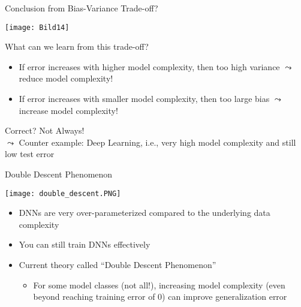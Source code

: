 \documentclass[aspectratio=169]{../latex_main/tntbeamer}  %
\begin{document}
	\begin{frame}{Conclusion from Bias-Variance Trade-off?}
	\vspace{-2em}
	   \begin{center}
	        \texttt{[image: Bild14]}   
	   \end{center}
	    
	 What can we learn from this trade-off?
	 
	 \begin{itemize}
	     \item If error increases with higher model complexity, then too high variance $\leadsto$ reduce model complexity!
	     \item If error increases with smaller model complexity, then too large bias $\leadsto$ increase model complexity!
	 \end{itemize}
	 
	 Correct? Not Always!\\
	 $\leadsto$ Counter example: Deep Learning, i.e., very high model complexity and still low test error
	    
	\end{frame}
	
	\begin{frame}{Double Descent Phenomenon}
	\vspace{-2em}
	   \begin{center}
	        \texttt{[image: double\_descent.PNG]}   
	   \end{center}
    
    \begin{itemize}
        \item DNNs are very over-parameterized compared to the underlying data complexity
        \item You can still train DNNs effectively
        \item Current theory called ``Double Descent Phenomenon''
        \begin{itemize}
            \item For some model classes (not all!), increasing model complexity (even beyond reaching training error of 0) can improve generalization error
        \end{itemize}
    \end{itemize}    

	\end{frame}
	
	
\end{document}
